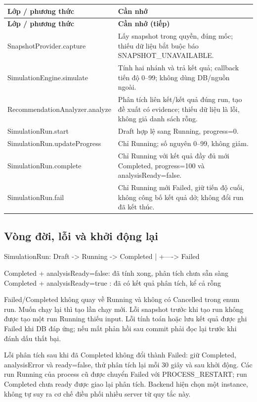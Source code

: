 \documentclass[12pt,a4paper]{article}
\newenvironment{PairTable}[2]{%
  \begin{longtable}{|L{39mm}|L{106mm}|}\hline
  \textbf{#1} & \textbf{#2}\\\hline\endfirsthead
  \hline\textbf{#1} & \textbf{#2 (tiếp)}\\\hline\endhead
}{\end{longtable}}
\begin{document}
\begin{PairTable}{Lớp / phương thức}{Cần nhớ}
SnapshotProvider.\allowbreak capture & Lấy snapshot trong quyền, đúng mốc; thiếu dữ liệu bắt buộc báo SNAPSHOT\_UNAVAILABLE.\\\hline
SimulationEngine.\allowbreak simulate & Tính hai nhánh và trả kết quả; callback tiến độ 0--99; không dùng DB/nguồn ngoài.\\\hline
Recommendation\allowbreak Analyzer.\allowbreak analyze & Phân tích liên kết/kết quả đúng run, tạo đề xuất có evidence; thiếu dữ liệu là lỗi, không giả danh sách rỗng.\\\hline
SimulationRun.\allowbreak start & Draft hợp lệ sang Running, progress=0.\\\hline
SimulationRun.\allowbreak updateProgress & Chỉ Running; số nguyên 0--99, không giảm.\\\hline
SimulationRun.\allowbreak complete & Chỉ Running với kết quả đầy đủ mới Completed, progress=100 và analysisReady=false.\\\hline
SimulationRun.\allowbreak fail & Chỉ Running mới Failed, giữ tiến độ cuối, không công bố kết quả dở; không đổi run đã kết thúc.\\\hline
\end{PairTable}

\subsection{Vòng đời, lỗi và khởi động lại}
\begin{Flow}
SimulationRun: Draft -> Running -> Completed
                            |
                            +----> Failed

Completed + analysisReady=false: đã tính xong, phân tích chưa sẵn sàng
Completed + analysisReady=true : đã có kết quả phân tích, kể cả rỗng
\end{Flow}

Failed/Completed không quay về Running và không có Cancelled trong enum run. Muốn chạy lại thì tạo lần chạy mới. Lỗi snapshot trước khi tạo run không được tạo một run Running thiếu input. Lỗi tính toán hoặc lưu kết quả được ghi Failed khi DB đáp ứng; nếu mất phản hồi sau commit phải đọc lại trước khi đánh dấu thất bại.

Lỗi phân tích sau khi đã Completed không đổi thành Failed: giữ Completed, analysisError và ready=false, thử phân tích lại mỗi 30 giây và sau khởi động. Các run Running của process cũ được chuyển Failed với PROCESS\_RESTART; run Completed chưa ready được giao lại phân tích. Backend hiện chọn một instance, không tự suy ra cơ chế điều phối nhiều server từ quy tắc này.
\end{document}
